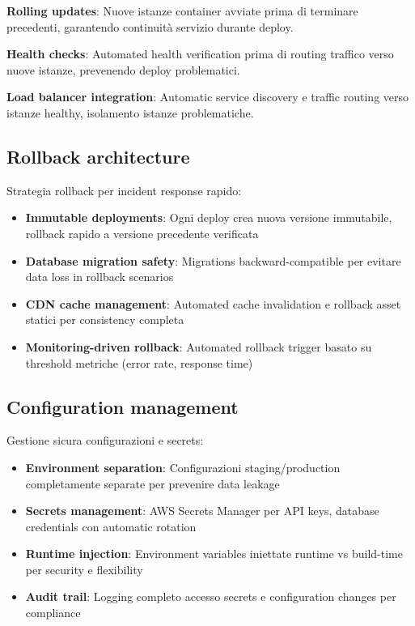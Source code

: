 \textbf{Rolling updates}: Nuove istanze container avviate prima di terminare 
precedenti, garantendo continuità servizio durante deploy.

\textbf{Health checks}: Automated health verification prima di routing traffico 
verso nuove istanze, prevenendo deploy problematici.

\textbf{Load balancer integration}: Automatic service discovery e traffic 
routing verso istanze healthy, isolamento istanze problematiche.

\subsection{Rollback architecture}
Strategia rollback per incident response rapido:
\begin{itemize}
  \item \textbf{Immutable deployments}: Ogni deploy crea nuova versione immutabile, 
  rollback rapido a versione precedente verificata
  \item \textbf{Database migration safety}: Migrations backward-compatible per 
  evitare data loss in rollback scenarios
  \item \textbf{CDN cache management}: Automated cache invalidation e rollback 
  asset statici per consistency completa
  \item \textbf{Monitoring-driven rollback}: Automated rollback trigger basato 
  su threshold metriche (error rate, response time)
\end{itemize}

\subsection{Configuration management}
Gestione sicura configurazioni e secrets:
\begin{itemize}
  \item \textbf{Environment separation}: Configurazioni staging/production 
  completamente separate per prevenire data leakage
  \item \textbf{Secrets management}: AWS Secrets Manager per API keys, database 
  credentials con automatic rotation
  \item \textbf{Runtime injection}: Environment variables iniettate runtime 
  vs build-time per security e flexibility
  \item \textbf{Audit trail}: Logging completo accesso secrets e configuration 
  changes per compliance
\end{itemize}

